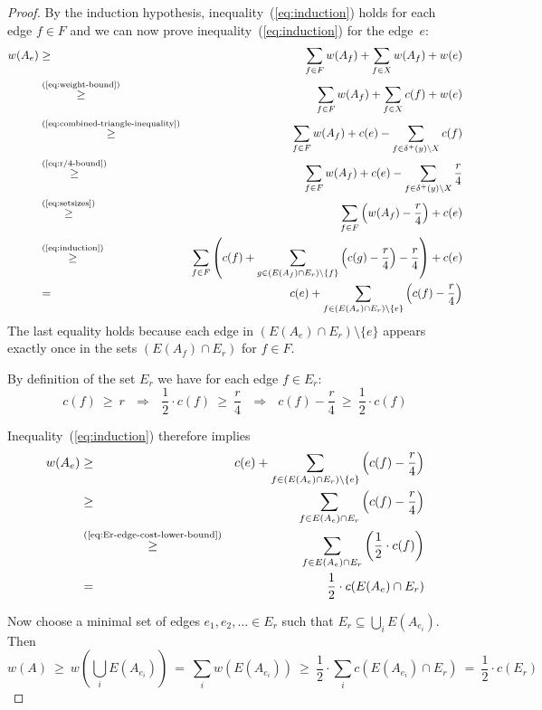 \documentclass[a4paper, 11pt]{article}
\begin{document}
\begin{proof}
By the induction hypothesis, inequality~(\ref{eq:induction}) holds for each edge $f\in F$ and we can now prove inequality~(\ref{eq:induction}) for the edge~$e$:
\begin{eqnarray*}
w(A_e) & \ge                                            & \sum_{f\in F} w(A_f) + \sum_{f\in X} w(A_f) + w(e) \\
       & \stackrel{(\text{\ref{eq:weight-bound}})}{\ge}  & \sum_{f\in F} w(A_f) + \sum_{f\in X} c(f) + w(e) \\
       & \stackrel{(\text{\ref{eq:combined-triangle-inequality}})}{\ge} & \sum_{f\in F} w(A_f) + c(e) - \sum_{f\in \delta^+(y)\setminus X} c(f) \\
       & \stackrel{(\text{\ref{eq:r/4-bound}})}{\ge}    & \sum_{f\in F} w(A_f) + c(e) - \sum_{f\in \delta^+(y)\setminus X} \frac{r}{4} \\
       & \stackrel{(\text{\ref{eq:setsizes}})}{\ge}     & \sum_{f\in F} \left( w(A_f) - \frac{r}{4} \right)  + c(e)  \\
       & \stackrel{(\text{\ref{eq:induction}})}{\ge}    & \sum_{f\in F} \left( c(f) + \sum_{g\in (E(A_f)\cap E_r)\setminus\{f\}} \left( c(g) -\frac{r}{4} \right) - \frac{r}{4} \right)  + c(e)  \\
       &                           =                    & c(e) + \sum_{f\in (E(A_e) \cap E_r) \setminus \{e\}} \left ( c(f) - \frac{r}{4}\right)  
\end{eqnarray*} 
The last equality holds because each edge in  $(E(A_e) \cap E_r) \setminus \{e\}$ appears exactly once in the sets 
$(E(A_f)\cap E_r)$ for $f\in F$. 
 
 
By definition of the set $E_r$ we have for each edge $f\in E_r$: 
\begin{equation}
c(f) ~\ge~ r ~~~\Rightarrow~~~ \frac{1}{2} \cdot c(f) ~\ge~ \frac{r}{4} ~~~\Rightarrow~~~ c(f) - \frac{r}{4} ~\ge~ \frac{1}{2} \cdot c(f)
\label{eq:Er-edge-cost-lower-bound}
\end{equation} 
 
Inequality~(\ref{eq:induction}) therefore implies 
\begin{eqnarray*}
w(A_e) & \ge   & c(e) + \sum_{f\in (E(A_e) \cap E_r) \setminus \{e\}} \left ( c(f) - \frac{r}{4}\right)\\
       & \ge   & \sum_{f\in E(A_e) \cap E_r} \left ( c(f) - \frac{r}{4}\right) \\
       & \stackrel{(\text{\ref{eq:Er-edge-cost-lower-bound}})}{\ge}   & \sum_{f\in E(A_e) \cap  E_r} \left ( \frac{1}{2}  \cdot c(f)\right)\\
       & =     & \frac{1}{2} \cdot c(E(A_e) \cap E_r)  
\end{eqnarray*} 

Now choose a minimal set of edges $e_1, e_2, \ldots \in E_r$ such that $E_r \subseteq \bigcup_{i} E(A_{e_i})$.
Then 
\[ w(A) ~\ge~ w(\bigcup_{i} E(A_{e_i})) ~=~ \sum_{i} w(E(A_{e_i})) ~\ge~ \frac{1}{2} \cdot \sum_{i} c(E(A_{e_i}) \cap E_r)  ~=~ \frac{1}{2} \cdot c(E_r)\]
\end{proof}
\end{document}
